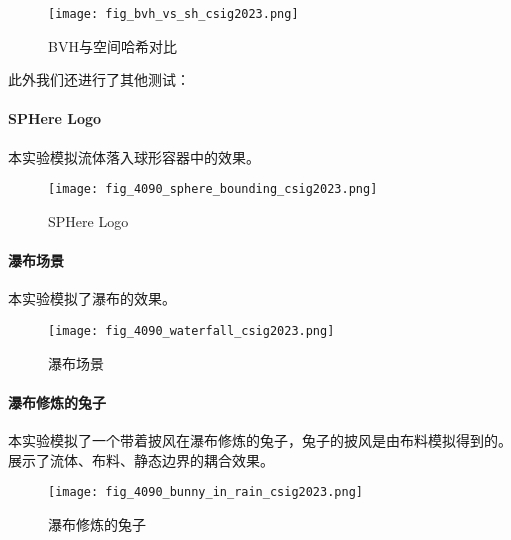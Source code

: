 \begin{figure}[H]
	\centering
	\texttt{[image: fig\_bvh\_vs\_sh\_csig2023.png]}
	\caption{BVH与空间哈希对比}
	\label{fig:bvhvssh}
\end{figure}

此外我们还进行了其他测试：

\paragraph{SPHere Logo} 本实验模拟流体落入球形容器中的效果。
\begin{figure}[H]
	\centering
	\texttt{[image: fig\_4090\_sphere\_bounding\_csig2023.png]}
	\caption{SPHere Logo}
\end{figure}
\paragraph{瀑布场景} 本实验模拟了瀑布的效果。
\begin{figure}[H]
	\centering
	\texttt{[image: fig\_4090\_waterfall\_csig2023.png]}
	\caption{瀑布场景}
\end{figure}
\paragraph{瀑布修炼的兔子} 本实验模拟了一个带着披风在瀑布修炼的兔子，兔子的披风是由布料模拟得到的。展示了流体、布料、静态边界的耦合效果。
\begin{figure}[H]
	\centering
	\texttt{[image: fig\_4090\_bunny\_in\_rain\_csig2023.png]}
	\caption{瀑布修炼的兔子}
\end{figure}